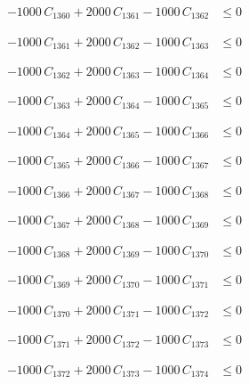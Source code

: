 \documentclass[a4paper,11pt]{article}
\begin{document}
\begin{align}
-1000\,C_{1360} + 2000\,C_{1361} - 1000\,C_{1362} &\leq 0 \nonumber
\end{align}

\begin{align}
-1000\,C_{1361} + 2000\,C_{1362} - 1000\,C_{1363} &\leq 0 \nonumber
\end{align}

\begin{align}
-1000\,C_{1362} + 2000\,C_{1363} - 1000\,C_{1364} &\leq 0 \nonumber
\end{align}

\begin{align}
-1000\,C_{1363} + 2000\,C_{1364} - 1000\,C_{1365} &\leq 0 \nonumber
\end{align}

\begin{align}
-1000\,C_{1364} + 2000\,C_{1365} - 1000\,C_{1366} &\leq 0 \nonumber
\end{align}

\begin{align}
-1000\,C_{1365} + 2000\,C_{1366} - 1000\,C_{1367} &\leq 0 \nonumber
\end{align}

\begin{align}
-1000\,C_{1366} + 2000\,C_{1367} - 1000\,C_{1368} &\leq 0 \nonumber
\end{align}

\begin{align}
-1000\,C_{1367} + 2000\,C_{1368} - 1000\,C_{1369} &\leq 0 \nonumber
\end{align}

\begin{align}
-1000\,C_{1368} + 2000\,C_{1369} - 1000\,C_{1370} &\leq 0 \nonumber
\end{align}

\begin{align}
-1000\,C_{1369} + 2000\,C_{1370} - 1000\,C_{1371} &\leq 0 \nonumber
\end{align}

\begin{align}
-1000\,C_{1370} + 2000\,C_{1371} - 1000\,C_{1372} &\leq 0 \nonumber
\end{align}

\begin{align}
-1000\,C_{1371} + 2000\,C_{1372} - 1000\,C_{1373} &\leq 0 \nonumber
\end{align}

\begin{align}
-1000\,C_{1372} + 2000\,C_{1373} - 1000\,C_{1374} &\leq 0 \nonumber
\end{align}
\end{document}
